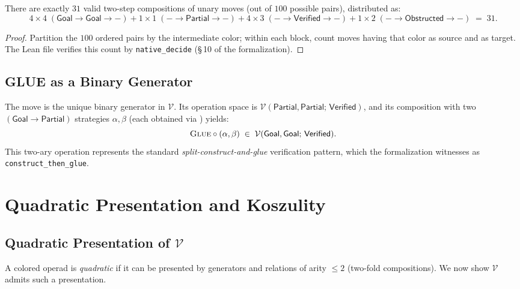 \documentclass[11pt]{article}
\newcommand{\Vop}{\mathcal{V}}           %
\newcommand{\Ops}[2]{\Vop(#1;\,#2)}      %
\newcommand{\partialPrf}{\mathsf{Partial}} %
\newcommand{\goalCol}{\mathsf{Goal}}      %
\newcommand{\verifCol}{\mathsf{Verified}} %
\newcommand{\obstCol}{\mathsf{Obstructed}}%
\begin{document}
\begin{proposition}\label{prop:valid-pairs}
There are exactly $31$ valid two-step compositions of unary moves
(out of $100$ possible pairs), distributed as:
\[
  4\!\times\!4 \;(\goalCol\to\goalCol\to{-})
  + 1\!\times\!1 \;({-}\to\partialPrf\to{-})
  + 4\!\times\!3 \;({-}\to\verifCol\to{-})
  + 1\!\times\!2 \;({-}\to\obstCol\to{-})
  \;=\; 31.
\]
\end{proposition}

\begin{proof}
Partition the $100$ ordered pairs by the intermediate color; within
each block, count moves having that color as source and as target.
The Lean file verifies this count by \texttt{native\_decide}
(\S\,10 of the formalization).
\end{proof}

\subsection{GLUE as a Binary Generator}

The move \GLUE is the unique binary generator in $\Vop$.  Its operation
space is $\Ops{\partialPrf,\partialPrf}{\verifCol}$, and its composition
with two $(\goalCol \to \partialPrf)$ strategies $\alpha, \beta$
(each obtained via \CONSTRUCT) yields:
\[
  \GLUE \circ (\alpha, \beta) \;\in\;
  \Ops{\goalCol,\goalCol}{\verifCol}.
\]
This two-ary operation represents the standard
\emph{split-construct-and-glue} verification pattern, which the
formalization witnesses as \texttt{construct\_then\_glue}.

\section{Quadratic Presentation and Koszulity}\label{sec:koszul}

\subsection{Quadratic Presentation of $\Vop$}

A colored operad is \emph{quadratic} if it can be presented by
generators and relations of arity $\le 2$ (two-fold compositions).
We now show $\Vop$ admits such a presentation.
\end{document}
